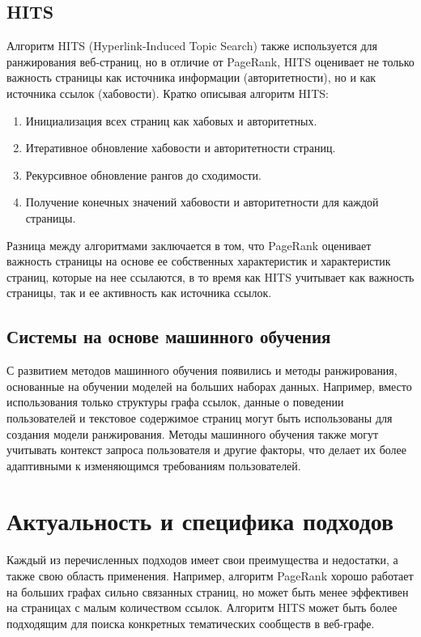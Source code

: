 \documentclass[a4paper]{article}
\begin{document}
	\subsection{HITS}
	
Алгоритм HITS (Hyperlink-Induced Topic Search) также используется для ранжирования веб-страниц, но в отличие от PageRank, HITS оценивает не только важность страницы как источника информации (авторитетности), но и как источника ссылок (хабовости). Кратко описывая алгоритм HITS:

\begin{enumerate}
	\item Инициализация всех страниц как хабовых и авторитетных.
	\item Итеративное обновление хабовости и авторитетности страниц.
	\item Рекурсивное обновление рангов до сходимости.
	\item Получение конечных значений хабовости и авторитетности для каждой страницы.
\end{enumerate}

Разница между алгоритмами заключается в том, что PageRank оценивает важность страницы на основе ее собственных характеристик и характеристик страниц, которые на нее ссылаются, в то время как HITS учитывает как важность страницы, так и ее активность как источника ссылок.

	
	\subsection{Системы на основе машинного обучения}
	
	С развитием методов машинного обучения появились и методы ранжирования, основанные на обучении моделей на больших наборах данных. Например, вместо использования только структуры графа ссылок, данные о поведении пользователей и текстовое содержимое страниц могут быть использованы для создания модели ранжирования. Методы машинного обучения также могут учитывать контекст запроса пользователя и другие факторы, что делает их более адаптивными к изменяющимся требованиям пользователей.
	
	\section{Актуальность и специфика подходов}
	
	Каждый из перечисленных подходов имеет свои преимущества и недостатки, а также свою область применения. Например, алгоритм PageRank хорошо работает на больших графах сильно связанных страниц, но может быть менее эффективен на страницах с малым количеством ссылок. Алгоритм HITS может быть более подходящим для поиска конкретных тематических сообществ в веб-графе.
	
\end{document}
